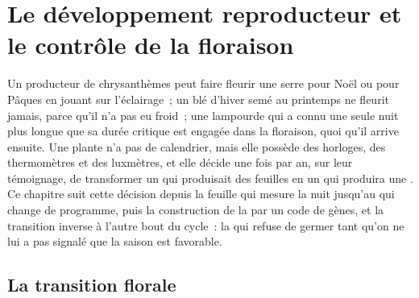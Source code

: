 \chapter{Le développement reproducteur et le contrôle de la floraison}\label{ch:b2:plant-flowering}

Un producteur de chrysanthèmes peut faire fleurir une serre pour Noël ou
pour Pâques en jouant sur l'éclairage~; un blé d'hiver semé au printemps
ne fleurit jamais, parce qu'il n'a pas eu froid~; une lampourde qui a
connu une seule nuit plus longue que sa durée critique est engagée dans
la floraison, quoi qu'il arrive ensuite. Une plante n'a pas de
calendrier, mais elle possède des horloges, des thermomètres et des
luxmètres, et elle décide une fois par an, sur leur témoignage, de
transformer un  qui produisait des feuilles en un  qui
produira une . Ce chapitre suit cette décision depuis la feuille qui
mesure la nuit jusqu'au  qui change de programme, puis la
construction de la  par un code de gènes, et la transition inverse
à l'autre bout du cycle~: la  qui refuse de germer tant qu'on ne
lui a pas signalé que la saison est favorable.

\section{La transition florale}

